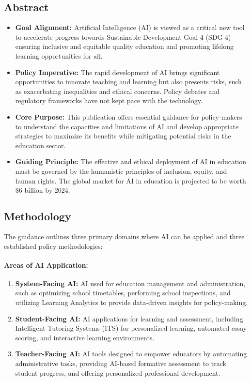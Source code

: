 \documentclass[12pt,a4paper]{report}
\begin{document}
\subsection{Abstract}
\begin{itemize}
  \item \textbf{Goal Alignment:} Artificial Intelligence (AI) is viewed as a critical new tool to accelerate progress towards Sustainable Development Goal 4 (SDG 4)--ensuring inclusive and equitable quality education and promoting lifelong learning opportunities for all.
  \item \textbf{Policy Imperative:} The rapid development of AI brings significant opportunities to innovate teaching and learning but also presents risks, such as exacerbating inequalities and ethical concerns. Policy debates and regulatory frameworks have not kept pace with the technology.
  \item \textbf{Core Purpose:} This publication offers essential guidance for policy-makers to understand the capacities and limitations of AI and develop appropriate strategies to maximize its benefits while mitigating potential risks in the education sector.
  \item \textbf{Guiding Principle:} The effective and ethical deployment of AI in education must be governed by the humanistic principles of inclusion, equity, and human rights. The global market for AI in education is projected to be worth \$6 billion by 2024.
\end{itemize}

\subsection{Methodology}
The guidance outlines three primary domains where AI can be applied and three established policy methodologies:

\paragraph{Areas of AI Application:}
\begin{enumerate}
  \item \textbf{System-Facing AI:} AI used for education management and administration, such as optimizing school timetables, performing school inspections, and utilizing Learning Analytics to provide data-driven insights for policy-making.
  \item \textbf{Student-Facing AI:} AI applications for learning and assessment, including Intelligent Tutoring Systems (ITS) for personalized learning, automated essay scoring, and interactive learning environments.
  \item \textbf{Teacher-Facing AI:} AI tools designed to empower educators by automating administrative tasks, providing AI-based formative assessment to track student progress, and offering personalized professional development.
\end{enumerate}
\end{document}
